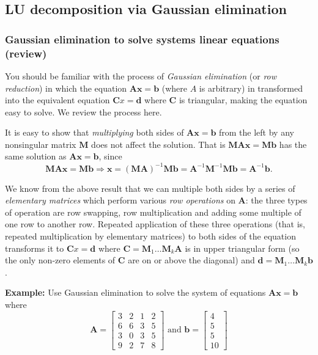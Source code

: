 \subsection{LU decomposition via Gaussian elimination} 
\label{sec:ludecomp}


\subsubsection{Gaussian elimination to solve systems linear equations (review)} 

You should be familiar with the process of {\em Gaussian elimination} (or {\em row reduction}) in which the equation $\mathbf{Ax} = \mathbf b$ (where $A$  is arbitrary) in transformed into the equivalent equation $\mathbf Cx = \mathbf d$ where $\mathbf C$ is triangular, making the equation easy to solve.  We review the process here.  


It is easy to show that {\em multiplying}  both sides of $\mathbf{Ax}=\mathbf{b}$ from the left by any nonsingular matrix $\mathbf{M}$ does not affect the solution.  That is  $\mathbf{MAx}=\mathbf{Mb}$ has the same solution as  $\mathbf{Ax}=\mathbf{b}$, since 
\[ \mathbf{MAx}=\mathbf{Mb} \Rightarrow \mathbf{x}=\left(\mathbf{MA}\right)^{-1}\mathbf{Mb} = \mathbf{A}^{-1}\mathbf{M}^{-1}\mathbf{M}\mathbf{b}=\mathbf{A}^{-1}\mathbf{b}.
\]

We know from the above result that we can multiple both sides by a series of {\em elementary matrices} which perform various {\em row operations} on $\mathbf A$:  the three types of operation are row swapping, row multiplication and adding some multiple of one row to another row.  Repeated application of these three operations (that is, repeated multiplication by elementary matrices) to both sides of the equation transforms it to $\mathbf Cx = \mathbf d$ where $ \mathbf C = \mathbf M_1\ldots \mathbf M_k \mathbf A $ is in  upper  triangular form (so the only non-zero elements of $\mathbf C$ are on or above the diagonal) and $ \mathbf d = \mathbf M_1\ldots \mathbf M_k \mathbf b $.





{\bf Example:} Use Gaussian elimination to solve the system of equations   $\mathbf{Ax} = \mathbf b$ where  
\[ \mathbf A = \left[\begin{array}{rrrr}3&2&1&2\\6&6&3&5\\3&0&3&5\\9&2&7&8\end{array}\right] \mbox{ and } \mathbf b = \left[\begin{array}{r}4\\5\\5\\10\end{array}\right] \]

